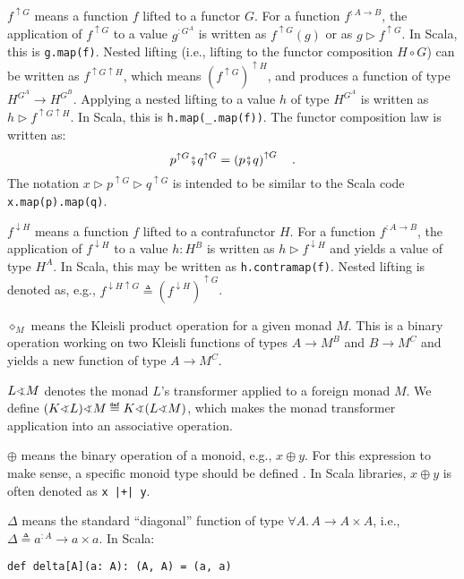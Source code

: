 $f^{\uparrow G}$ means a function $f$ lifted to a functor $G$.
For a function $f^{:A\rightarrow B}$, the application of $f^{\uparrow G}$
to a value $g^{:G^{A}}$ is written as $f^{\uparrow G}(g)$ or as
$g\triangleright f^{\uparrow G}$. In Scala, this is \lstinline!g.map(f)!.
Nested lifting (i.e., lifting to the functor composition $H\circ G$)
can be written as $f^{\uparrow G\uparrow H}$, which means $\left(f^{\uparrow G}\right)^{\uparrow H}$,
and produces a function of type $H^{G^{A}}\rightarrow H^{G^{B}}$.
Applying a nested lifting to a value $h$ of type $H^{G^{A}}$ is
written as $h\triangleright f^{\uparrow G\uparrow H}$. In Scala,
this is \lstinline!h.map(_.map(f))!. The functor composition law
is written as:
\[
p^{\uparrow G}\bef q^{\uparrow G}=\left(p\bef q\right)^{\uparrow G}\quad.
\]
The notation $x\triangleright p^{\uparrow G}\triangleright q^{\uparrow G}$
is intended to be similar to the Scala code \lstinline!x.map(p).map(q)!.

$f^{\downarrow H}$ means a function $f$ lifted to a contrafunctor
$H$. For a function $f^{:A\rightarrow B}$, the application of $f^{\downarrow H}$
to a value $h:H^{B}$ is written as $h\triangleright f^{\downarrow H}$
and yields a value of type $H^{A}$. In Scala, this may be written
as \lstinline!h.contramap(f)!. Nested lifting is denoted as, e.g.,
$f^{\downarrow H\uparrow G}\triangleq(f^{\downarrow H})^{\uparrow G}$.

$\diamond_{M}$ means the Kleisli product operation for a given monad
$M$. This is a binary operation working on two Kleisli functions
of types $A\rightarrow M^{B}$ and $B\rightarrow M^{C}$ and yields
a new function of type $A\rightarrow M^{C}$.

$L\varangle M$ denotes the monad $L$\textsf{'}s transformer applied to a
foreign monad $M$. We define $(K\varangle L)\varangle M\triangleq K\varangle(L\varangle M)$,
which makes the monad transformer application into an associative
operation.

$\oplus$ means the binary operation of a monoid, e.g., $x\oplus y$.
For this expression to make sense, a specific monoid type should be
defined . In Scala libraries, $x\oplus y$ is often denoted as \lstinline!x |+| y!.

$\Delta$ means the standard \textsf{``}diagonal\textsf{''} function of type $\forall A.\,A\rightarrow A\times A$,
i.e., $\Delta\triangleq a^{:A}\rightarrow a\times a$. In Scala:
\begin{lstlisting}
def delta[A](a: A): (A, A) = (a, a)
\end{lstlisting}

